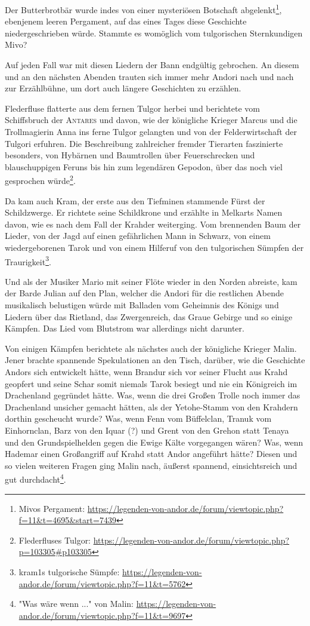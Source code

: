 Der Butterbrotbär wurde indes von einer mysteriösen Botschaft abgelenkt\footnote{Mivos Pergament: \url{https://legenden-von-andor.de/forum/viewtopic.php?f=11&t=4695&start=7439}}, ebenjenem leeren Pergament, auf das eines Tages diese Geschichte niedergeschrieben würde. Stammte es womöglich vom tulgorischen Sternkundigen Mivo?

Auf jeden Fall war mit diesen Liedern der Bann endgültig gebrochen. An diesem und an den nächsten Abenden trauten sich immer mehr Andori nach und nach zur Erzählbühne, um dort auch längere Geschichten zu erzählen.

Flederfluse flatterte aus dem fernen Tulgor herbei und berichtete vom Schiffsbruch der \textsc{Antares} und davon, wie der königliche Krieger Marcus und die Trollmagierin Anna ins ferne Tulgor gelangten und von der Felderwirtschaft der Tulgori erfuhren. Die Beschreibung zahlreicher fremder Tierarten faszinierte besonders, von Hybärnen und Baumtrollen über Feuerschrecken und blauschuppigen Feruns bis hin zum legendären Gepodon, über das noch viel gesprochen würde\footnote{Flederfluses Tulgor: \url{https://legenden-von-andor.de/forum/viewtopic.php?p=103305\#p103305}}. 

Da kam auch Kram, der erste aus den Tiefminen stammende Fürst der Schildzwerge. Er richtete seine Schildkrone und erzählte in Melkarts Namen davon, wie es nach dem Fall der Krahder weiterging. Vom brennenden Baum der Lieder, von der Jagd auf einen gefährlichen Mann in Schwarz, von einem wiedergeborenen Tarok und von einem Hilferuf von den tulgorischen Sümpfen der Traurigkeit\footnote{kram1s tulgorische Sümpfe: \url{https://legenden-von-andor.de/forum/viewtopic.php?f=11&t=5762}}.

Und als der Musiker Mario mit seiner Flöte wieder in den Norden abreiste, kam der Barde Julian auf den Plan, welcher die Andori für die restlichen Abende musikalisch belustigen würde mit Balladen vom Geheimnis des Königs und Liedern über das Rietland, das Zwergenreich, das Graue Gebirge und so einige Kämpfen. Das Lied vom Blutstrom war allerdings nicht darunter.

Von einigen Kämpfen berichtete als nächstes auch der königliche Krieger Malin. Jener brachte spannende Spekulationen an den Tisch, darüber, wie die Geschichte Andors sich entwickelt hätte, wenn Brandur sich vor seiner Flucht aus Krahd geopfert und seine Schar somit niemals Tarok besiegt und nie ein Königreich im Drachenland gegründet hätte. Was, wenn die drei Großen Trolle noch immer das Drachenland unsicher gemacht hätten, als der Yetohe-Stamm von den Krahdern dorthin gescheucht wurde? Was, wenn Fenn vom Büffelclan, Tranuk vom Einhornclan, Barz von den Iquar (?) und Grent von den Grehon statt Tenaya und den Grundspielhelden gegen die Ewige Kälte vorgegangen wären? Was, wenn Hademar einen Großangriff auf Krahd statt Andor angeführt hätte? Diesen und so vielen weiteren Fragen ging Malin nach, äußerst spannend, einsichtsreich und gut durchdacht\footnote{"Was wäre wenn ..." von Malin: \url{https://legenden-von-andor.de/forum/viewtopic.php?f=11&t=9697}}.



